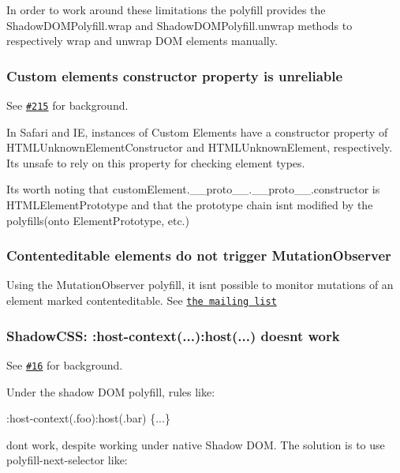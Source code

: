 In order to work around these limitations the polyfill provides the {\ttfamily Shadow\+D\+O\+M\+Polyfill.\+wrap} and {\ttfamily Shadow\+D\+O\+M\+Polyfill.\+unwrap} methods to respectively wrap and unwrap D\+OM elements manually.

\subsubsection*{Custom element\textquotesingle{}s constructor property is unreliable }

See \href{https://github.com/webcomponents/webcomponentsjs/issues/215}{\tt \#215} for background.

In Safari and IE, instances of Custom Elements have a {\ttfamily constructor} property of {\ttfamily H\+T\+M\+L\+Unknown\+Element\+Constructor} and {\ttfamily H\+T\+M\+L\+Unknown\+Element}, respectively. It\textquotesingle{}s unsafe to rely on this property for checking element types.

It\textquotesingle{}s worth noting that {\ttfamily custom\+Element.\+\_\+\+\_\+proto\+\_\+\+\_\+.\+\_\+\+\_\+proto\+\_\+\+\_\+.\+constructor} is {\ttfamily H\+T\+M\+L\+Element\+Prototype} and that the prototype chain isn\textquotesingle{}t modified by the polyfills(onto {\ttfamily Element\+Prototype}, etc.)

\subsubsection*{Contenteditable elements do not trigger Mutation\+Observer }

Using the Mutation\+Observer polyfill, it isn\textquotesingle{}t possible to monitor mutations of an element marked {\ttfamily contenteditable}. See \href{https://groups.google.com/forum/#!msg/polymer-dev/LHdtRVXXVsA/v1sGoiTYWUkJ}{\tt the mailing list}

\subsubsection*{Shadow\+C\+SS\+: \+:host-\/context(...)\+:host(...) doesn\textquotesingle{}t work }

See \href{https://github.com/webcomponents/webcomponentsjs/issues/16}{\tt \#16} for background.

Under the shadow D\+OM polyfill, rules like\+: 
\begin{DoxyCode}
:host-context(.foo):host(.bar) \{...\}
\end{DoxyCode}
 don\textquotesingle{}t work, despite working under native Shadow D\+OM. The solution is to use {\ttfamily polyfill-\/next-\/selector} like\+:


